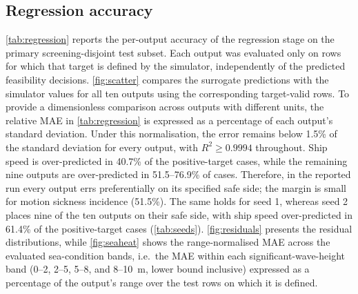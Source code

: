 \documentclass[final,5p,times,twocolumn,numbers]{elsarticle}
\begin{document}
\subsection{Regression accuracy}\label{sec:regacc}
\autoref{tab:regression} reports the per-output accuracy of the regression stage on the primary screening-disjoint test subset. Each output was evaluated only on rows for which that target is defined by the simulator, independently of the predicted feasibility decisions. \autoref{fig:scatter} compares the surrogate predictions with the simulator values for all ten outputs using the corresponding target-valid rows. To provide a dimensionless comparison across outputs with different units, the relative MAE in \autoref{tab:regression} is expressed as a percentage of each output's standard deviation. Under this normalisation, the error remains below 1.5\% of the standard deviation for every output, with $R^2\geq0.9994$ throughout. Ship speed is over-predicted in 40.7\% of the positive-target cases, while the remaining nine outputs are over-predicted in 51.5--76.9\% of cases. Therefore, in the reported run every output errs preferentially on its specified safe side; the margin is small for motion sickness incidence (51.5\%). The same holds for seed 1, whereas seed 2 places nine of the ten outputs on their safe side, with ship speed over-predicted in 61.4\% of the positive-target cases (\autoref{tab:seeds}). \autoref{fig:residuals} presents the residual distributions, while \autoref{fig:seaheat} shows the range-normalised MAE across the evaluated sea-condition bands, i.e.\ the MAE within each significant-wave-height band (0--2, 2--5, 5--8, and 8--10~m, lower bound inclusive) expressed as a percentage of the output's range over the test rows on which it is defined.
\end{document}
